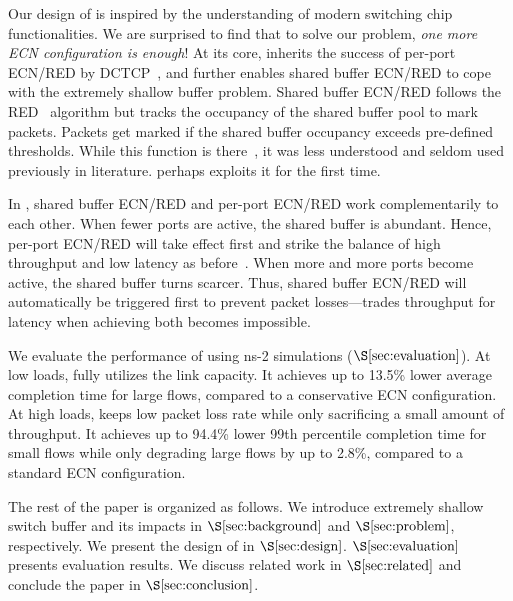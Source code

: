 
Our design of \sys is inspired by the understanding of modern switching chip functionalities. We are surprised to find that to solve our problem, \emph{one more ECN configuration is enough}! At its core, \sys inherits the success of per-port ECN/RED by DCTCP~\cite{dctcp}, and further enables shared buffer ECN/RED to cope with the extremely shallow buffer problem. Shared buffer ECN/RED follows the RED~\cite{RED} algorithm but tracks the occupancy of the shared buffer pool to mark packets. Packets get marked if the shared buffer occupancy exceeds pre-defined thresholds. While this function is there~\cite{arista_ecn,mqecn}, it was less understood and seldom used previously in literature. \sys perhaps exploits it for the first time.

In \sys, shared buffer ECN/RED and per-port ECN/RED work complementarily to each other. When fewer ports are active, the shared buffer is abundant. Hence, per-port ECN/RED will take effect first and strike the balance of high throughput and low latency as before~\cite{dctcp}. When more and more ports become active, the shared buffer turns scarcer. Thus, shared buffer ECN/RED will automatically be triggered first to prevent packet losses---\sys trades throughput for latency when achieving both becomes impossible.


We evaluate the performance of \sys using ns-2 simulations ($\S\ref{sec:evaluation}$). At low loads, \sys fully utilizes the link capacity. It achieves up to 13.5\% lower average completion time for large flows, compared to a conservative ECN configuration. At high loads, \sys keeps low packet loss rate while only sacrificing a small amount of throughput. It achieves up to 94.4\% lower 99th percentile completion time for small flows while only degrading large flows by up to 2.8\%, compared to a standard ECN configuration.

The rest of the paper is organized as follows. We introduce extremely shallow switch buffer and its impacts in $\S\ref{sec:background}$ and $\S\ref{sec:problem}$, respectively. We present the design of \sys in $\S\ref{sec:design}$. $\S\ref{sec:evaluation}$ presents evaluation results. We discuss related work in $\S\ref{sec:related}$ and conclude the paper in $\S\ref{sec:conclusion}$.


